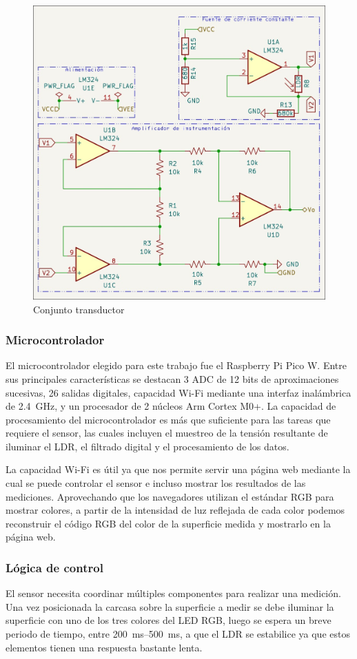 \documentclass[12pt,a4paper,twoside,fleqn]{article}
\begin{document}
\begin{figure}
    \centering
    \includegraphics[width=0.5\linewidth]{img/sensor.jpg}
    \caption{Conjunto transductor}
    \label{fig:sensor}
\end{figure}

\subsubsection*{Microcontrolador}
El microcontrolador elegido para este trabajo fue el Raspberry Pi Pico W. Entre sus principales características se destacan 3 ADC de 12 bits de aproximaciones sucesivas, 26 salidas digitales, capacidad Wi-Fi mediante una interfaz inalámbrica de \qty{2.4}{\GHz}, y un procesador de 2 núcleos Arm Cortex M0+. La capacidad de procesamiento del microcontrolador es más que suficiente para las tareas que requiere el sensor, las cuales incluyen el muestreo de la tensión resultante de iluminar el LDR, el filtrado digital y el procesamiento de los datos.

La capacidad Wi-Fi es útil ya que nos permite servir una página web mediante la cual se puede controlar el sensor e incluso mostrar los resultados de las mediciones. Aprovechando que los navegadores utilizan el estándar RGB para mostrar colores, a partir de la intensidad de luz reflejada de cada color podemos reconstruir el código RGB del color de la superficie medida y mostrarlo en la página web.

\subsubsection*{Lógica de control}
El sensor necesita coordinar múltiples componentes para realizar una medición. Una vez posicionada la carcasa sobre la superficie a medir se debe iluminar la superficie con uno de los tres colores del LED RGB, luego se espera un breve periodo de tiempo, entre \qtyrange{200}{500}{\ms}, a que el LDR se estabilice ya que estos elementos tienen una respuesta bastante lenta. 
\end{document}
